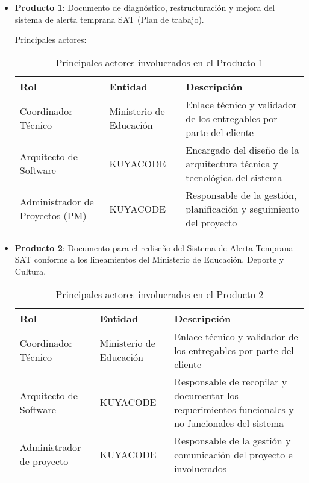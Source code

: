 \begin{itemize}
    \item \textbf{Producto 1}: Documento de diagnóstico, restructuración y mejora del sistema de alerta temprana SAT (Plan de trabajo).

    Principales actores:
    \begin{table}[h]
        \centering
        \begin{tabular}{|p{3cm}|p{5cm}|p{7cm}|}
            \hline
            \textbf{Rol} & \textbf{Entidad} & \textbf{Descripción} \\
            \hline
            Coordinador Técnico & Ministerio de Educación & Enlace técnico y validador de los entregables por parte del cliente \\
            \hline
            Arquitecto de Software & KUYACODE & Encargado del diseño de la arquitectura técnica y tecnológica del sistema \\
            \hline
            Administrador de Proyectos (PM) & KUYACODE & Responsable de la gestión, planificación y seguimiento del proyecto \\
            \hline
        \end{tabular}
        \caption{Principales actores involucrados en el Producto 1}
        \label{tab:actores_producto1}
    \end{table}
    
    \item \textbf{Producto 2}: Documento para el rediseño del Sistema de Alerta Temprana SAT conforme a los lineamientos del Ministerio de Educación, Deporte y Cultura.\\
    \begin{table}[htbp]
        \centering
        \begin{tabular}{|p{3cm}|p{5cm}|p{7cm}|}
            \hline
            \textbf{Rol} & \textbf{Entidad} & \textbf{Descripción} \\
            \hline
            Coordinador Técnico & Ministerio de Educación & Enlace técnico y validador de los entregables por parte del cliente \\
            \hline
            Arquitecto de Software & KUYACODE & Responsable de recopilar y documentar los requerimientos funcionales y no funcionales del sistema \\
            \hline
            Administrador de proyecto& KUYACODE & Responsable de la gestión y comunicación del proyecto e involucrados \\
            \hline
        \end{tabular}
        \caption{Principales actores involucrados en el Producto 2}
        \label{tab:actores_producto2}
    \end{table}
    \\


\end{itemize}
